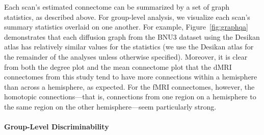 \documentclass[11pt]{article}
\begin{document}
\begin{multicols}{2}
Each scan's estimated connectome can be summarized by a set of graph statistics, as described above. For group-level analysis, we visualize each scan's summary statistics overlaid on one another. For example, Figure~\ref{fig:graphqa} demonstrates that each diffusion graph from the BNU3 dataset using the Desikan atlas has relatively similar values for the statistics (we use the Desikan atlas for the remainder of the analyses unless otherwise specified). Moreover, it is clear from both the degree plot and the mean connectome plot that the dMRI connectomes from this study tend to have more connections within a hemisphere than across a hemisphere, as expected. For the fMRI connectomes, however, the homotopic connections---that is, connections from one region on a hemisphere to the same region on the other hemisphere---seem particularly strong.
 



\paragraph{Group-Level Discriminability}
\label{sec:disc}


\end{multicols}
\end{document}

